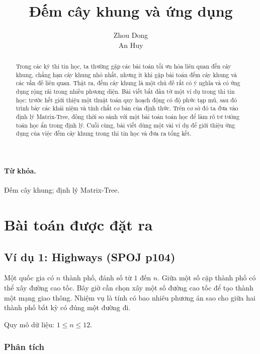 \documentclass[11pt]{article}
\title{Đếm cây khung và ứng dụng}
\author{Zhou Dong\\An Huy}
\date{}
\begin{document}
\maketitle


\begin{abstract}
Trong các kỳ thi tin học, ta thường gặp các bài toán tối ưu hóa liên quan đến
cây khung, chẳng hạn cây khung nhỏ nhất, nhưng ít khi gặp bài toán đếm cây
khung và các vấn đề liên quan. Thật ra, đếm cây khung là một chủ đề rất có ý
nghĩa và có ứng dụng rộng rãi trong nhiều phương diện. Bài viết bắt đầu từ
một ví dụ trong thi tin học: trước hết giới thiệu một thuật toán quy hoạch
động có độ phức tạp mũ, sau đó trình bày các khái niệm và tính chất cơ bản
của định thức. Trên cơ sở đó ta đưa vào định lý Matrix-Tree, đồng thời so
sánh với một bài toán toán học để làm rõ tư tưởng toán học ẩn trong định lý.
Cuối cùng, bài viết dùng một vài ví dụ để giới thiệu ứng dụng của việc đếm cây
khung trong thi tin học và đưa ra tổng kết.
\end{abstract}

\paragraph{Từ khóa.}
Đếm cây khung; định lý Matrix-Tree.

\section{Bài toán được đặt ra}

\subsection*{Ví dụ 1: Highways (SPOJ p104)}

Một quốc gia có \(n\) thành phố, đánh số từ \(1\) đến \(n\). Giữa một số cặp
thành phố có thể xây đường cao tốc. Bây giờ cần chọn xây một số đường cao tốc
để tạo thành một mạng giao thông. Nhiệm vụ là tính có bao nhiêu phương án sao
cho giữa hai thành phố bất kỳ có đúng một đường đi.

Quy mô dữ liệu: \(1\le n\le 12\).

\subsubsection*{Phân tích}
\end{document}
